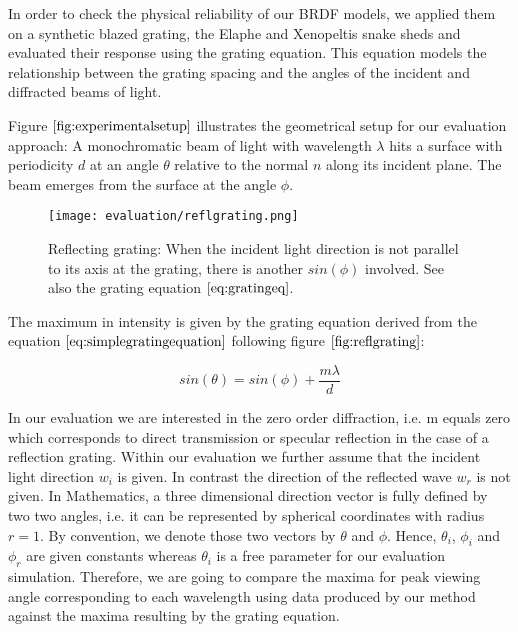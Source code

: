 In order to check the physical reliability of our BRDF models, we applied them on a synthetic blazed grating, the Elaphe and Xenopeltis snake sheds and evaluated their response using the grating equation. This equation models the relationship between the grating spacing and the angles of the incident and diffracted beams of light. 

Figure $\ref{fig:experimentalsetup}$ illustrates the geometrical setup for our evaluation approach: A monochromatic beam of light with wavelength $\lambda$ hits a surface with periodicity $d$ at an angle $\theta$ relative to the normal $n$ along its incident plane. The beam emerges from the surface at the angle $\phi$. 

\begin{figure}[H]
  \centering
  \texttt{[image: evaluation/reflgrating.png]}
  \caption{Reflecting grating: When the incident light direction is not parallel to its axis at the grating, there is another $sin(\phi)$ involved. See also the grating equation $\ref{eq:gratingeq}$.}
  \label{fig:reflgrating}
\end{figure}

The maximum in intensity is given by the grating equation derived from the equation $\ref{eq:simplegratingequation}$ following figure $\ref{fig:reflgrating}$: 

\begin{equation}
  sin(\theta) = sin(\phi) + \frac{m \lambda}{d}
\label{eq:gratingeq}
\end{equation}

In our evaluation we are interested in the zero order diffraction, i.e. m equals zero which corresponds to direct transmission or specular reflection in the case of a reflection grating. Within our evaluation we further assume that the incident light direction $w_i$ is given. In contrast the direction of the reflected wave $w_r$ is not given.
In Mathematics, a three dimensional direction vector is fully defined by two two angles, i.e. it can be represented by spherical coordinates with radius $r = 1$. By convention, we denote those two vectors by $\theta$ and $\phi$. Hence, $\theta_i$, $\phi_i$ and $\phi_r$ are given constants whereas $\theta_i$ is a free parameter for our evaluation simulation. Therefore, we are going to compare the maxima for peak viewing angle corresponding to each wavelength using data produced by our method against the maxima resulting by the grating equation.

